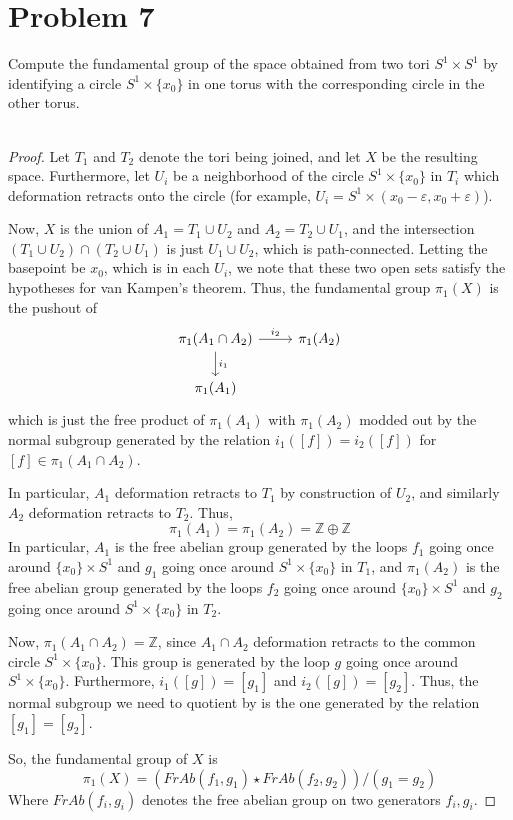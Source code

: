 \documentclass[fontsize=11pt]{scrartcl} %
\numberwithin{equation}{section} %
\numberwithin{figure}{section} %
\numberwithin{table}{section} %
\newcommand{\Z}{\mathbb{Z}}
\begin{document}
\section*{Problem 7}
Compute the fundamental group of the space obtained from two tori $S^1\times
S^1$ by identifying a circle $S^1\times \{x_0\}$ in one torus with the
corresponding circle in the other torus.
\\
\\
\begin{proof}
    Let $T_1$ and $T_2$ denote the tori being joined, and let $X$ be the
    resulting space.
    Furthermore, let $U_i$ be a neighborhood of the circle $S^1\times \{x_0\}$
    in $T_i$ which deformation retracts onto the circle (for example, $U_i =
    S^1\times (x_0-\varepsilon,x_0+\varepsilon)$).

    Now, $X$ is the union of $A_1 = T_1\cup U_2$ and $A_2 = T_2\cup U_1$, and the
    intersection $(T_1\cup U_2) \cap (T_2\cup U_1)$ is just $U_1\cup U_2$, which
    is path-connected. Letting the basepoint be $x_0$, which is in each $U_i$,
    we note that these two open sets satisfy the hypotheses for van Kampen's
    theorem. Thus, the fundamental group $\pi_1(X)$ is the pushout of
    \[
        \begin{tikzcd}
            \pi_1(A_1\cap A_2)\arrow{d}{i_1}\arrow{r}{i_2} &\pi_1(A_2)\\
            \pi_1(A_1)
        \end{tikzcd}
    \]
    which is just the free product of $\pi_1(A_1)$ with $\pi_1(A_2)$ modded out
    by the normal subgroup generated by the relation $i_1([f]) = i_2([f])$ for
    $[f]\in \pi_1(A_1\cap A_2)$.

    In particular, $A_1$ deformation retracts to $T_1$ by construction of
    $U_2$, and similarly $A_2$ deformation retracts to $T_2$. Thus,
    \[
        \pi_1(A_1) = \pi_1(A_2) = \Z\oplus\Z
    \]
    In particular, $A_1$ is the free abelian group
    generated by the loops $f_1$ going once around $\{x_0\}\times S^1$ and $g_1$
    going once around $S^1\times \{x_0\}$ in
    $T_1$, and $\pi_1(A_2)$ is the free abelian group generated by the loops $f_2$
    going once around $\{x_0\}\times S^1$ and $g_2$ going once around $S^1\times
    \{x_0\}$ in $T_2$. 

    Now, $\pi_1(A_1\cap A_2) = \Z$, since $A_1\cap A_2$ deformation retracts to
    the common circle $S^1\times \{x_0\}$. This group is generated by the loop
    $g$ going once around $S^1\times \{x_0\}$. Furthermore, $i_1([g]) = [g_1]$
    and $i_2([g]) = [g_2]$. Thus, the normal subgroup we need to quotient by is
    the one generated by the relation $[g_1] = [g_2]$.

    So, the fundamental group of $X$ is
    \[
        \pi_1(X) = (FrAb(f_1,g_1)\star FrAb(f_2,g_2))/{(g_1=g_2)}
    \]
    Where $FrAb(f_i,g_i)$ denotes the free abelian group on two generators
    $f_i,g_i$.
\end{proof}
\end{document}
